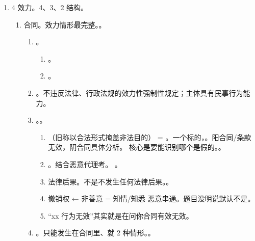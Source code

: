 \begin{enumerate}
\begin{enumerate}
          \item {}。
        \end{enumerate}
  \item 4 效力。4、3、2 结构。
        \begin{enumerate}
          \item 合同。效力情形最完整。。
                \begin{enumerate}
                  \item {}。
                        \begin{enumerate}
                          \item {}。
                          \item {}。
                        \end{enumerate}
                  \item {}。不违反法律、行政法规的效力性强制性规定；主体具有民事行为能力。
                  \item {}。。
                        \begin{enumerate}
                          \item {}（旧称以合法形式掩盖非法目的） = 。一个标的，。阳合同/条款无效，阴合同具体分析。
                                核心是要能识别哪个是假的。。
                          \item {}。结合恶意代理考。
                                。
                          \item 法律后果。不是不发生任何法律后果。。
                          \item 撤销权 ← 非善意 = 知情/知悉 \bdy 恶意串通。题目没明说默认不是。
                          \item “xx 行为无效”其实就是在问你合同有效无效。
                        \end{enumerate}
                  \item {}。只能发生在合同里、就 2 种情形。。
                        \begin{enumerate}

\end{enumerate}
\end{enumerate}
\end{enumerate}
\end{enumerate}
